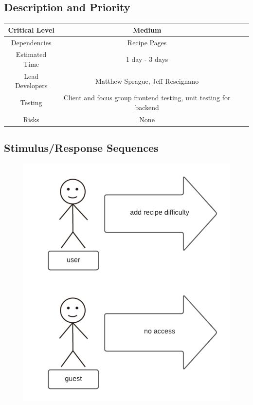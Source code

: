 \documentclass{scrreprt}
\begin{document}
\subsection{Description and Priority}
\begin{center}
    \begin{tabular}{| c | c | c | c |}
        \hline
        Critical Level  & Medium                                                            \\
        \hline
        Dependencies    & Recipe Pages                                                      \\
        \hline
        Estimated Time  & 1 day - 3 days                                                    \\
        \hline
        Lead Developers & Matthew Sprague, Jeff Rescignano                                      \\
        \hline
        Testing         & Client and focus group \gls{frontend} testing,
                          \gls{unit testing} for \gls{backend}                                 \\
        \hline
        Risks           & None                                                              \\
        \hline
    \end{tabular}
\end{center}

\subsection{Stimulus/Response Sequences}

\begin{figure}[H]\centering
    \includegraphics[width=\columnwidth]{response diagrams/Recipe Difficulty.png}
\end{figure}
\end{document}
